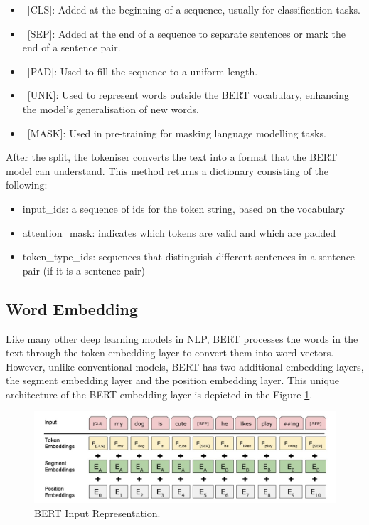 \documentclass[ %
                    author={Bocheng Wang},
                supervisor={Dr. Qiang Liu},
                    degree={MSc},
                     title={A Research on Identification of Suicide Ideation in Texts with Multiple Models},
                      type={},
                      year={2024}]{dissertation}
\begin{document}
\begin{itemize}
      \item\ [CLS]: Added at the beginning of a sequence, usually for classification tasks.
      \item\ [SEP]: Added at the end of a sequence to separate sentences or mark the end of a sentence pair.
      \item\ [PAD]: Used to fill the sequence to a uniform length.
      \item\ [UNK]: Used to represent words outside the BERT vocabulary, enhancing the model's generalisation of new words.
      \item\ [MASK]: Used in pre-training for masking language modelling tasks.
\end{itemize}

After the split, the tokeniser converts the text into a format that the BERT model can understand. This method returns a dictionary consisting of the following:

\begin{itemize}
      \item input\_ids: a sequence of ids for the token string, based on the vocabulary
      \item attention\_mask: indicates which tokens are valid and which are padded
      \item token\_type\_ids: sequences that distinguish different sentences in a sentence pair (if it is a sentence pair)
\end{itemize}

\subsection{Word Embedding}
\noindent
Like many other deep learning models in NLP, BERT processes the words in the text through the token embedding layer to convert them into word vectors. However, unlike conventional models, BERT has two additional embedding layers, the segment embedding layer and the position embedding layer. This unique architecture of the BERT embedding layer is depicted in the Figure \ref{fig:bert_embedding}.

\begin{figure}[h]
      \centering
      \includegraphics[width=0.6\linewidth]{../img/bert_embedding.jpg}
      \caption[BERT Input Representation]{BERT Input Representation.\cite{devlin2018bert}}
      \label{fig:bert_embedding}
\end{figure}
\end{document}
